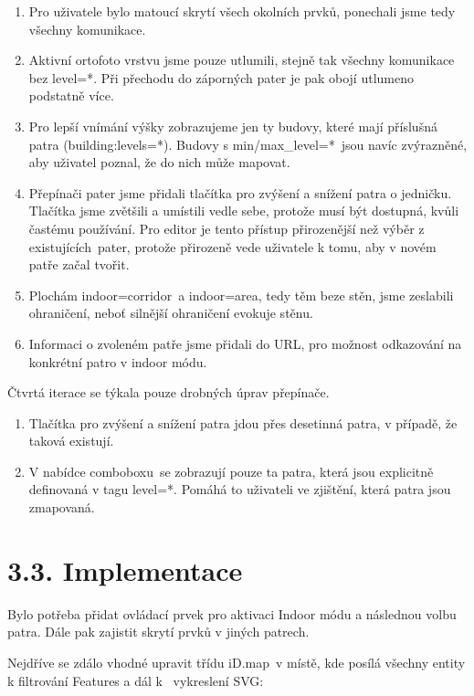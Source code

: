 \begin{enumerate}
\tightlist
\item
  Pro uživatele bylo matoucí skrytí všech okolních prvků, ponechali jsme tedy všechny komunikace.
\item
  Aktivní ortofoto vrstvu jsme pouze utlumili, stejně tak všechny komunikace bez level=*. Při přechodu do záporných pater je pak obojí utlumeno podstatně více.
\item
  Pro lepší vnímání výšky zobrazujeme jen ty budovy, které mají příslušná patra (building:levels=*). Budovy s min/max\_level=*~jsou navíc zvýrazněné, aby uživatel poznal, že do nich může mapovat.
\item
  Přepínači pater jsme přidali tlačítka pro zvýšení a snížení patra o jedničku. Tlačítka jsme zvětšili a umístili vedle sebe, protože musí být dostupná, kvůli častému používání. Pro editor je tento přístup přirozenější než výběr z existujících~pater, protože přirozeně vede uživatele k tomu, aby v novém patře začal tvořit.
\item
  Plochám indoor=corridor~a indoor=area, tedy těm beze stěn, jsme zeslabili ohraničení, neboť silnější ohraničení evokuje stěnu.
\item
  Informaci o zvoleném patře jsme přidali do URL, pro možnost odkazování na konkrétní patro v indoor módu.
\end{enumerate}

Čtvrtá iterace se týkala pouze drobných úprav přepínače.

\begin{enumerate}
\tightlist
\item
  Tlačítka pro zvýšení a snížení patra jdou přes desetinná patra, v případě, že taková existují.
\item
  V nabídce comboboxu~se zobrazují pouze ta patra, která jsou explicitně definovaná v tagu level=*. Pomáhá to uživateli ve zjištění, která patra jsou zmapovaná.
\end{enumerate}

\section{3.3. Implementace}\label{implementace}

Bylo potřeba přidat ovládací prvek pro aktivaci Indoor módu a následnou volbu patra. Dále pak zajistit skrytí prvků v jiných patrech.

Nejdříve se zdálo vhodné upravit třídu iD.map~v místě, kde posílá všechny entity k filtrování Features a dál k ~vykreslení SVG:

